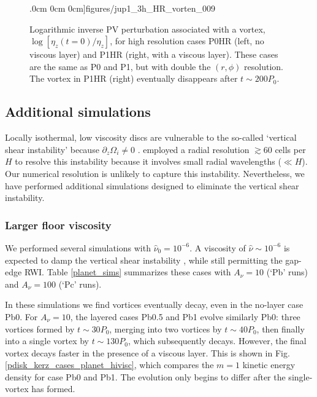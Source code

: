 \begin{figure}
    .0cm 0cm 0cm]{figures/jup1_3h_HR_vorten_009}
  \caption{Logarithmic inverse PV perturbation associated with a
    vortex, $\log{\left[\eta_z(t=0)/\eta_z\right]}$, for high resolution cases
    P0HR (left, no viscous layer) and P1HR (right, with a viscous
    layer). These cases are the same as P0 and P1, but with double the
    $(r,\phi)$ resolution. The vortex in P1HR (right) eventually disappears
     after $t \sim 200P_0$. 
    \label{HR_sims}}
\end{figure}

\subsection{Additional simulations}%
Locally isothermal, low viscosity discs are vulnerable to the
so-called `vertical shear 
instability' because $\partial_z\Omega_i\neq 0$ \citep{nelson12}. 
\citeauthor{nelson12} employed a radial  resolution $\gtrsim 60$ cells
per $H$ to resolve this instability because it involves small radial
wavelengths ($\ll H$). Our numerical resolution is unlikely to capture
this instability. Nevertheless, we have performed additional
simulations designed to eliminate the vertical shear instability.   

\subsubsection{Larger floor viscosity}
We performed several simulations with $\hat{\nu}_0=10^{-6}$. A viscosity of
$\hat{\nu}\sim 10^{-6}$ is expected to damp the vertical shear 
instability \citep{nelson12}, while still permitting the gap-edge
RWI. Table \ref{planet_sims} summarizes
these cases with $A_\nu=10$ (`Pb' runs) and $A_\nu=100$ (`Pc' runs). 

In these simulations we find vortices eventually decay, even in the
no-layer case Pb0. For $A_\nu=10$, the layered cases Pb0.5 and Pb1 evolve
similarly Pb0: three vortices formed by $t\sim30P_0$, merging into two
vortices by $t\sim40P_0$, then finally into a single vortex by
$t\sim130P_0$, which subsequently decays. However, the final vortex
decays faster in the presence of a viscous layer. This is shown in
Fig. \ref{pdisk_kerz_cases_planet_hivisc}, which compares the $m=1$
kinetic energy density for case Pb0 and Pb1. The evolution only begins
to differ after the single-vortex has formed. 

